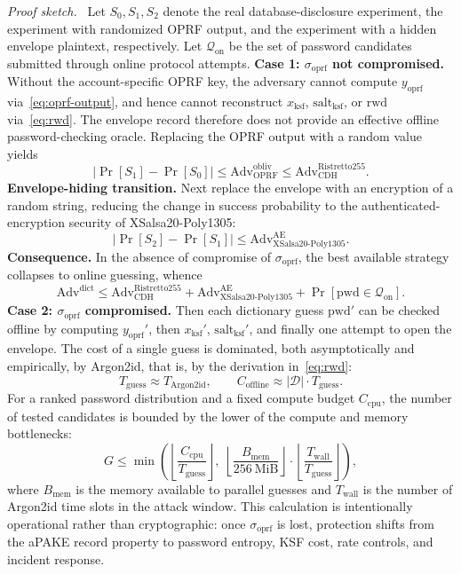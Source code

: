 \documentclass[preprint,12pt]{elsarticle}
\newcommand{\sigoprf}{\sigma_{\mathrm{oprf}}}
\theoremstyle{remark}
\newenvironment{sketchproof}{\par\noindent\textit{Proof sketch.}\ }{\par}
\begin{document}
\begin{sketchproof}
Let $S_0,S_1,S_2$ denote the real database-disclosure experiment, the
experiment with randomized OPRF output, and the experiment with a hidden
envelope plaintext, respectively. Let $\mathcal{Q}_{\mathrm{on}}$ be the
set of password candidates submitted through online protocol attempts.
\textbf{Case 1: \textnormal{$\sigoprf$ not compromised.}}
Without the account-specific OPRF key, the adversary cannot compute
$y_{\mathrm{oprf}}$ via~\eqref{eq:oprf-output}, and hence cannot
reconstruct $x_{\mathrm{ksf}}$, $\mathrm{salt}_{\mathrm{ksf}}$, or
$\mathrm{rwd}$ via~\eqref{eq:rwd}. The envelope record therefore does
not provide an effective offline password-checking oracle. Replacing
the OPRF output with a random value yields
\[
  |\Pr[S_1] - \Pr[S_0]| \leq
  \mathrm{Adv}_{\mathrm{OPRF}}^{\mathrm{obliv}}
  \leq \mathrm{Adv}_{\mathrm{CDH}}^{\mathrm{Ristretto255}}.
\]
\textbf{Envelope-hiding transition.} Next replace the envelope with an
encryption of a random string, reducing the change in success probability
to the authenticated-encryption security of XSalsa20-Poly1305:
\[
  |\Pr[S_2] - \Pr[S_1]| \leq
  \mathrm{Adv}_{\mathrm{XSalsa20\text{-}Poly1305}}^{\mathrm{AE}}.
\]
\textbf{Consequence.} In the absence of compromise of
$\sigoprf$, the best available strategy collapses to online guessing,
whence
\[
  \mathrm{Adv}^{\mathrm{dict}} \leq
  \mathrm{Adv}_{\mathrm{CDH}}^{\mathrm{Ristretto255}} +
  \mathrm{Adv}_{\mathrm{XSalsa20\text{-}Poly1305}}^{\mathrm{AE}} +
  \Pr[\mathrm{pwd} \in \mathcal{Q}_{\mathrm{on}}].
\]
\textbf{Case 2: \textnormal{$\sigoprf$ compromised.}} Then
each dictionary guess $\mathrm{pwd}'$ can be checked offline by
computing $y_{\mathrm{oprf}}'$, then
$x_{\mathrm{ksf}}'$, $\mathrm{salt}_{\mathrm{ksf}}'$, and finally one
attempt to open the envelope. The cost of a single guess is dominated,
both asymptotically and empirically, by Argon2id, that is, by the
derivation in~\eqref{eq:rwd}:
\[
  T_{\mathrm{guess}} \approx T_{\mathrm{Argon2id}},\qquad
  C_{\mathrm{offline}} \approx |\mathcal{D}| \cdot T_{\mathrm{guess}}.
\]
For a ranked password distribution and a fixed compute budget $C_{\mathrm{cpu}}$, the
number of tested candidates is bounded by the lower of the compute and
memory bottlenecks:
\[
  G \leq
  \min\!\left(
    \left\lfloor \frac{C_{\mathrm{cpu}}}{T_{\mathrm{guess}}} \right\rfloor,\;
    \left\lfloor \frac{B_{\mathrm{mem}}}{256~\mathrm{MiB}} \right\rfloor
      \cdot
      \left\lfloor \frac{T_{\mathrm{wall}}}{T_{\mathrm{guess}}} \right\rfloor
  \right),
\]
where $B_{\mathrm{mem}}$ is the memory available to parallel guesses and
$T_{\mathrm{wall}}$ is the number of Argon2id time slots in the attack
window. This calculation is intentionally operational rather than
cryptographic: once $\sigoprf$ is lost, protection shifts from the
aPAKE record property to password entropy, KSF cost, rate controls, and
incident response.
\end{sketchproof}
\end{document}
